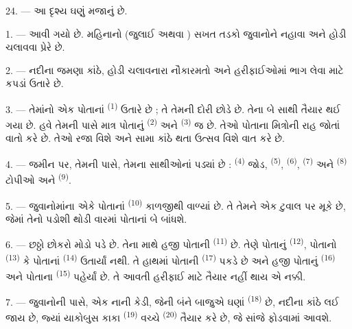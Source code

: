 24. --- આ દૃશ્ય ઘણું મજાનું છે.

\VUsaut{4.0mm}
\VUsaut{3.0mm}

\VUsaut{2.4mm}

\VUsaut{3.0mm}

1. ---  આવી ગયો છે.  મહિનાનો (જુલાઈ અથવા
) સખત તડકો જુવાનોને નહાવા અને હોડી ચલાવવા પ્રેરે છે.

2. --- નદીના જમણા કાંઠે, હોડી ચલાવનારા નૌકારમતો અને હરીફાઈઓમાં ભાગ
લેવા માટે કપડાં ઉતારે છે.

3. --- તેમાંનો એક પોતાનાં  \textsuperscript{(1)} ઉતારે છે ;
તે તેમની દોરી છોડે છે. તેના બે સાથી તૈયાર થઈ ગયા છે. હવે તેમની પાસે
માત્ર પોતાનું  \textsuperscript{(2)} અને
 \textsuperscript{(3)} જ છે. તેઓ પોતાના મિત્રોની
રાહ જોતાં વાતો કરે છે. તેઓ રજા વિશે અને સામા કાંઠે થતા ઉત્સવ વિશે વાત
કરે છે.

4. --- જમીન પર, તેમની પાસે, તેમના સાથીઓનાં  પડ્યાં છે :
 \textsuperscript{(4)} જોડ, 
\textsuperscript{(5)},  \textsuperscript{(6)},
 \textsuperscript{(7)} અને 
\textsuperscript{(8)} ટોપીઓ અને  \textsuperscript{(9)}.

5. --- જુવાનોમાંના એકે પોતાનાં  \textsuperscript{(10)}
કાળજીથી વાળ્યાં છે. તે તેમને એક ટુવાલ પર મૂકે છે, જેમાં તેનો પડોશી
થોડી વારમાં પોતાનાં બે  બાંધશે.

6. --- છઠ્ઠો છોકરો મોડો પડે છે. તેના માથે હજી પોતાની 
\textsuperscript{(11)} છે. તેણે પોતાનું 
\textsuperscript{(12)}, પોતાનો  \textsuperscript{(13)} કે
પોતાનાં  \textsuperscript{(14)} ઉતાર્યાં નથી. તે હાથમાં
પોતાની  \textsuperscript{(17)} પકડે છે અને હજી પોતાનું
 \textsuperscript{(16)} અને પોતાના 
\textsuperscript{(15)} પહેર્યાં છે. તે આવતી હરીફાઈ માટે તૈયાર નહીં થાય
એ નક્કી.

7. --- જુવાનોની પાસે, એક નાની કેડી, જેની બંને બાજુએ ઘણાં
 \textsuperscript{(18)} છે, નદીના કાંઠે લઈ
જાય છે, જ્યાં યાકોબુસ કાકા  \textsuperscript{(19)} વચ્ચે
 \textsuperscript{(20)} તૈયાર કરે છે, જે સાંજે
ફોડવામાં આવશે.


